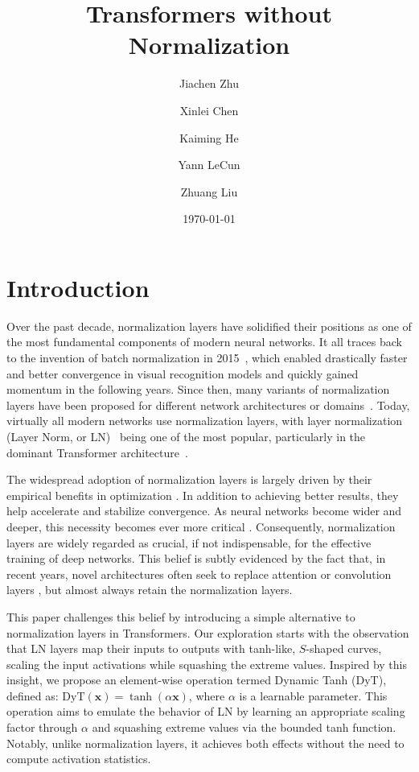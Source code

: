 \documentclass[]{fairmeta}
\title{Transformers without Normalization}
\author[1,2]{Jiachen Zhu}
\author[1]{Xinlei Chen}
\author[3]{Kaiming He}
\author[1,2]{Yann LeCun}
\author[1,4,\dagger]{Zhuang Liu}
\affiliation[1]{FAIR, Meta}
\affiliation[2]{New York University}
\affiliation[3]{MIT}
\affiliation[4]{Princeton University}
\date{\today}
\def\vx{{\bm{x}}}
\begin{document}
\maketitle






\section{Introduction}


Over the past decade, normalization layers have solidified their positions as one of the most fundamental components of modern neural networks.
It all traces back to the invention of batch normalization in 2015~\citep{ioffe2015batch}, which enabled drastically faster and better convergence in visual recognition models and quickly gained momentum in the following years.
Since then, many variants of normalization layers have been proposed for different network architectures or domains~\citep{ba2016layer,ulyanov2016instance,wu2018group,zhang2019root}.
Today, virtually all modern networks use normalization layers, with layer normalization (Layer Norm, or LN)~\citep{ba2016layer} being one of the most popular, particularly in the dominant Transformer architecture~\citep{vaswani2017attention, dosovitskiy2020image}.



The widespread adoption of normalization layers is largely driven by their empirical benefits in optimization \citep{santurkar2018does, bjorck2018understanding}.
In addition to achieving better results, they help accelerate and stabilize convergence.
As neural networks become wider and deeper, this necessity becomes ever more critical \citep{brock2021characterizing, huang2023normalization}.
Consequently, normalization layers are widely regarded as crucial, if not indispensable, for the effective training of deep networks.
This belief is subtly evidenced by the fact that, in recent years, novel architectures often seek to replace attention or convolution layers \citep{tolstikhin2021mlp,gu2023mamba, sun2024learning, feng2024were}, but almost always retain the normalization layers.


This paper challenges this belief by introducing a simple alternative to normalization layers in Transformers.
Our exploration starts with the observation that LN layers map their inputs to outputs with tanh-like, $S$-shaped curves,  scaling the input activations while squashing the extreme values.
Inspired by this insight, we propose an element-wise operation termed Dynamic Tanh (DyT), defined as: $\mathrm{DyT}(\vx) = \tanh(\alpha \vx)$, where $\alpha$ is a learnable parameter.
This operation aims to emulate the behavior of LN by learning an appropriate scaling factor through $\alpha$ and squashing extreme values via the bounded tanh function.
Notably, unlike normalization layers, it achieves both effects without the need to compute activation statistics.
\end{document}
